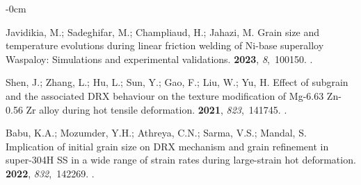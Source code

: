 \documentclass[metals,article,accept,pdftex,moreauthors]{Definitions/mdpi}
\begin{document}

\begin{adjustwidth}{-\extralength}{0cm}



\begin{thebibliography}{999}

Javidikia, M.; Sadeghifar, M.; Champliaud, H.; Jahazi, M.
\newblock Grain size and temperature evolutions during linear friction welding
  of Ni-base superalloy Waspaloy: Simulations and experimental validations.
 {\bf 2023}, {\em
  8},~100150.
.

Shen, J.; Zhang, L.; Hu, L.; Sun, Y.; Gao, F.; Liu, W.; Yu, H.
\newblock Effect of subgrain and the associated DRX behaviour on the texture
  modification of Mg-6.63 Zn-0.56 Zr alloy during hot tensile deformation.
 {\bf 2021}, {\em
  823},~141745.
.

Babu, K.A.; Mozumder, Y.H.; Athreya, C.N.; Sarma, V.S.; Mandal, S.
\newblock Implication of initial grain size on DRX mechanism and grain
  refinement in super-304H SS in a wide range of strain rates during
  large-strain hot deformation.
 {\bf 2022}, {\em
  832},~142269.
.


\end{thebibliography}
\end{adjustwidth}
\end{document}
